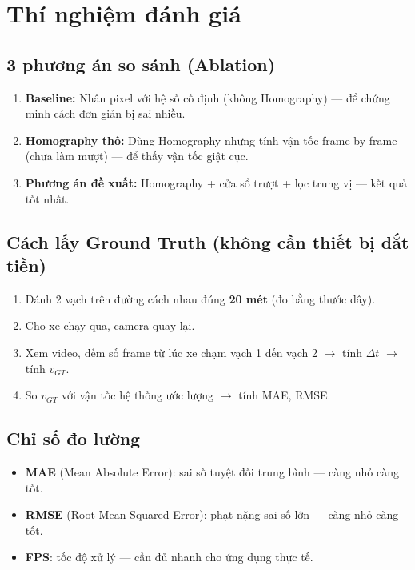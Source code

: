 \documentclass[11pt,a4paper]{article}
\begin{document}
\section{Thí nghiệm đánh giá}

\subsection{3 phương án so sánh (Ablation)}
\begin{enumerate}
    \item \textbf{Baseline:} Nhân pixel với hệ số cố định (không Homography) --- để chứng minh cách đơn giản bị sai nhiều.
    \item \textbf{Homography thô:} Dùng Homography nhưng tính vận tốc frame-by-frame (chưa làm mượt) --- để thấy vận tốc giật cục.
    \item \textbf{Phương án đề xuất:} Homography + cửa sổ trượt + lọc trung vị --- kết quả tốt nhất.
\end{enumerate}

\subsection{Cách lấy Ground Truth (không cần thiết bị đắt tiền)}
\begin{enumerate}
    \item Đánh 2 vạch trên đường cách nhau đúng \textbf{20 mét} (đo bằng thước dây).
    \item Cho xe chạy qua, camera quay lại.
    \item Xem video, đếm số frame từ lúc xe chạm vạch 1 đến vạch 2 $\rightarrow$ tính $\Delta t$ $\rightarrow$ tính $v_{GT}$.
    \item So $v_{GT}$ với vận tốc hệ thống ước lượng $\rightarrow$ tính MAE, RMSE.
\end{enumerate}

\subsection{Chỉ số đo lường}
\begin{itemize}
    \item \textbf{MAE} (Mean Absolute Error): sai số tuyệt đối trung bình --- càng nhỏ càng tốt.
    \item \textbf{RMSE} (Root Mean Squared Error): phạt nặng sai số lớn --- càng nhỏ càng tốt.
    \item \textbf{FPS}: tốc độ xử lý --- cần đủ nhanh cho ứng dụng thực tế.
\end{itemize}
\end{document}
